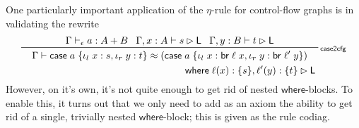 \documentclass[acmsmall,screen,review]{acmart}
\newcommand{\ms}[1]{\ensuremath{\mathsf{#1}}}
\newcommand{\lto}{:}
\newcommand{\linl}[1]{\iota_l\;{#1}}
\newcommand{\linr}[1]{\iota_r\;{#1}}
\newcommand{\brb}[2]{\ms{br}\;#1\;#2}
\newcommand{\casestmt}[5]{\ms{case}\;#1\;\{\linl{#2} \lto #3, \linr{#4} \lto #5\}}
\newcommand{\where}[2]{#1\;\ms{where}\;#2}
\newcommand{\wbranch}[3]{#1(#2) \lto \{#3\}}
\newcommand{\bhyp}[2]{#1 : #2}
\newcommand{\rle}[1]{{\scriptsize\textsf{#1}}}
\newcommand{\hasty}[4]{#1 \vdash_{#2} #3: {#4}}
\newcommand{\haslb}[3]{#1 \vdash #2 \rhd #3}
\newcommand{\teqv}{\approx}
\newcommand{\brle}[1]{{\textsf{#1}}}
\begin{document}
One particularly important application of the $\eta$-rule for control-flow graphs is in validating
the rewrite
\begin{equation}
  \prftree[r]{\rle{case2cfg}}
    {\hasty{\Gamma}{\epsilon}{a}{A + B}}
    {\haslb{\Gamma, \bhyp{x}{A}}{s}{\ms{L}}}
    {\haslb{\Gamma, \bhyp{y}{B}}{t}{\ms{L}}}
    {
      \prfStackPremises{\Gamma \vdash \casestmt{a}{x}{s}{y}{t} 
        \teqv (\casestmt{a}{x}{\brb{\ell}{x}}{y}{\brb{\ell'}{y}})}{
        \where{\hspace{16em}}
          {\wbranch{\ell}{x}{s}, \wbranch{\ell'}{y}{t}} \rhd \ms{L}}
    }
\end{equation}
However, on it's own, it's not quite enough to get rid of nested \ms{where}-blocks. To enable this,
it turns out that we only need to add as an axiom the ability to get rid of a single, trivially
nested \ms{where}-block; this is given as the rule \brle{codiag}.
\end{document}

